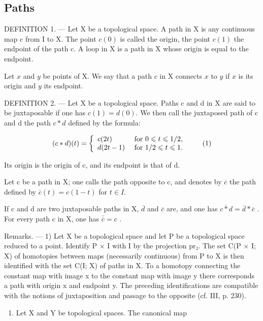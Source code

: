 \subsection{Paths}

DEFINITION 1. --- Let X be a topological space. A path in X is any continuous map c from I to X. The point \(c(0)\) is called the origin, the point \(c(1)\) the endpoint of the path c. A loop in X is a path in X whose origin is equal to the endpoint.

Let \(x\) and \(y\) be points of X. We say that a path \(c\) in X connects \(x\) to \(y\) if \(x\) is its origin and \(y\) its endpoint.

DEFINITION 2. --- Let X be a topological space. Paths c and d in X are said to be juxtaposable if one has \(c(1) = d(0)\). We then call the juxtaposed path of c and d the path \(c*d\) defined by the formula:

\[
(c * d) (t) = \left\{ \begin{array}{l l} c (2 t) & \text { for } 0 \leqslant t \leqslant 1 / 2, \\ d (2 t - 1) & \text { for } 1 / 2 \leqslant t \leqslant 1. \end{array} \right.\tag{1}
\]

Its origin is the origin of c, and its endpoint is that of d.

Let c be a path in X; one calls the path opposite to c, and denotes by \(\overline{c}\) the path defined by \(\overline{c}(t) = c(1 - t)\) for \(t \in I\).

If c and d are two juxtaposable paths in X, \(\overline{d}\) and \(\overline{c}\) are, and one has \(\overline{c*d} = \overline{d} * \overline{c}\) . For every path c in X, one has \(\overline{\overline{c}} = c\) .

Remarks. --- 1) Let X be a topological space and let P be a topological space reduced to a point. Identify P × I with I by the projection pr₂. The set C(P × I; X) of homotopies between maps (necessarily continuous) from P to X is then identified with the set C(I; X) of paths in X. To a homotopy connecting the constant map with image x to the constant map with image y there corresponds a path with origin x and endpoint y. The preceding identifications are compatible with the notions of juxtaposition and passage to the opposite (cf. III, p. 230).

\begin{enumerate}
\def\labelenumi{\arabic{enumi})}
\setcounter{enumi}{1}
\tightlist
\item
  Let X and Y be topological spaces. The canonical map
\end{enumerate}

